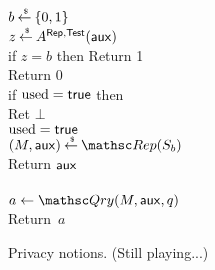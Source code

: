 \begin{figure}[htp]
\centering
{}
%
{
{
\\
$b {\:\stackrel{{\scriptscriptstyle \hspace{0.2em}\$}} {\leftarrow}\:} \{0,1\}$\\
$z {\:\stackrel{{\scriptscriptstyle \hspace{0.2em}\$}} {\leftarrow}\:} A^{\mathsf{Rep},\mathsf{Test}}({\sf aux})$\\
if $z = b$ then Return 1\\
Return 0
}
%
{
\\
if $\mathrm{used}=\mathsf{true}$ then \\
\nudge Ret $\bot$\\
$\mathrm{used}=\mathsf{true}$\\
$(M,\aux) \getsr \Rep(S_b)$\\
Return ${\sf aux}$\\

\medskip
{}\\
$a \gets \Qry(M,\aux,q)$\\
Return~$a$
}
}
\caption{Privacy notions. (Still playing...)} 
\label{fig:privacy}
\end{figure}
